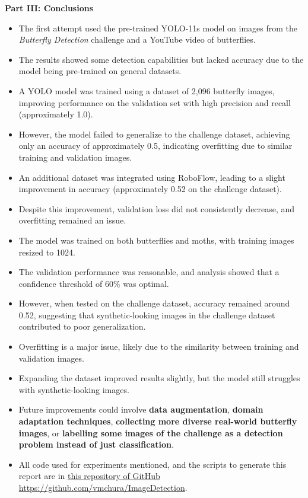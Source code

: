 \documentclass{cpsc202}
\begin{document}
    \centerline{\Large\textbf{Part III: Conclusions}}
    \begin{itemize}
        \item The first attempt used the pre-trained YOLO-11s model on images from the \textit{Butterfly Detection} challenge and a YouTube video of butterflies.
        \item The results showed some detection capabilities but lacked accuracy due to the model being pre-trained on general datasets.
        \item A YOLO model was trained using a dataset of 2,096 butterfly images, improving performance on the validation set with high precision and recall (approximately 1.0).
        \item However, the model failed to generalize to the challenge dataset, achieving only an accuracy of approximately 0.5, indicating overfitting due to similar training and validation images.
        \item An additional dataset was integrated using RoboFlow, leading to a slight improvement in accuracy (approximately 0.52 on the challenge dataset).
        \item Despite this improvement, validation loss did not consistently decrease, and overfitting remained an issue.
        \item The model was trained on both butterflies and moths, with training images resized to 1024.
        \item The validation performance was reasonable, and analysis showed that a confidence threshold of 60\% was optimal.
        \item However, when tested on the challenge dataset, accuracy remained around 0.52, suggesting that synthetic-looking images in the challenge dataset contributed to poor generalization.
        \item Overfitting is a major issue, likely due to the similarity between training and validation images.
        \item Expanding the dataset improved results slightly, but the model still struggles with synthetic-looking images.
        \item Future improvements could involve \textbf{data augmentation}, \textbf{domain adaptation techniques}, \textbf{collecting more diverse real-world butterfly images}, or \textbf{labelling some images of the challenge as a detection problem instead of just classification}.
        \item All code used for experiments mentioned, and the scripts to generate this report are in \href{https://github.com/vmchura/ImageDetection}{this repository of GitHub https://github.com/vmchura/ImageDetection}.
    \end{itemize}
\end{document}
